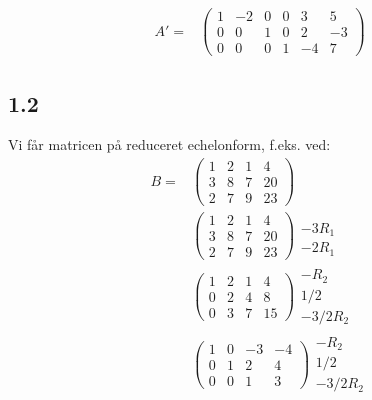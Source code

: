 \begin{align*}
				A'=&\left(\begin{array}{cccccc}{1} & {-2} & {0} & {0} & {3} & {5} \\ {0} & {0} & {1} & {0} & {2} & {-3} \\ {0} & {0} & {0} & {1} & {-4} & {7} \end{array}\right) 
			\end{align*} 

		\subsection{1.2}

		Vi får matricen på reduceret echelonform, f.eks. ved:
			\begin{align*}
				B=&\left(\begin{array}{llll}{1} & {2} & {1} & {4} \\ {3} & {8} & {7} & {20} \\ {2} & {7} & {9} & {23}\end{array}\right) \\
				&\left(\begin{array}{llll}{1} & {2} & {1} & {4} \\ {3} & {8} & {7} & {20} \\ {2} & {7} & {9} & {23}\end{array}\right) \begin{array}{c} \, \\ -3R_1 \\ -2R_1 \end{array}\\
				&\left(\begin{array}{llll}{1} & {2} & {1} & {4} \\ {0} & {2} & {4} & {8} \\ {0} & {3} & {7} & {15}\end{array}\right) \begin{array}{c} -R_2 \\ 1/2 \\ -3/2R_2 \end{array}\\
				&\left(\begin{array}{llll}{1} & {0} & {-3} & {-4} \\ {0} & {1} & {2} & {4} \\ {0} & {0} & {1} & {3}\end{array}\right) \begin{array}{c} -R_2 \\ 1/2 \\ -3/2R_2 \end{array}\\

\end{align*}
